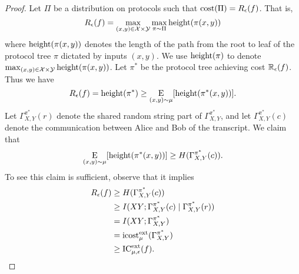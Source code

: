 \begin{proof}

Let $\Pi$ be a distribution on protocols such that $\mathrm{cost}(\Pi) = R_\epsilon(f)$. That is,
$$R_\epsilon(f) = \max_{(x,y) \in \mathcal{X}\times\mathcal{Y}}\max_{\pi \sim \Pi}\operatorname{height}(\pi(x,y))$$ 
where $\operatorname{height}(\pi(x,y))$ denotes the length of the path from the root to leaf of the protocol tree $\pi$ dictated by inputs $(x,y)$. We use $\operatorname{height}(\pi)$ to denote $\max_{(x,y) \in \mathcal{X}\times\mathcal{Y}}\operatorname{height}(\pi(x,y))$. Let $\pi^*$ be the protocol tree achieving cost $\mathbb{R}_\epsilon(f)$. Thus we have
$$R_\epsilon(f) = \operatorname{height}(\pi^*) \geq \operatorname*{\mathrm{E}}_{(x,y) \sim \mu} [\operatorname{height}(\pi^*(x,y))].$$
Let $\Gamma^{\pi^*}_{X,Y}(r)$ denote the shared random string part of $\Gamma^{\pi^*}_{X,Y}$, and let $\Gamma^{\pi^*}_{X,Y}(c)$ denote the communication between Alice and Bob of the transcript. We claim that
$$\operatorname*{\mathrm{E}}_{(x,y) \sim \mu} [\operatorname{height}(\pi^*(x,y))] \geq H(\Gamma^{\pi^*}_{X,Y}(c)).$$
To see this claim is sufficient, observe that it implies 
\begin{align*}
R_\epsilon(f) &\geq H(\Gamma^{\pi^*}_{X,Y}(c)) \\
&\geq I(XY; \Gamma^{\pi^*}_{X,Y}(c) \mid \Gamma^{\pi^*}_{X,Y}(r)) \\
&= I(XY ;\Gamma^{\pi^*}_{X,Y}) \\
&= \mathrm{icost}^{\mathrm{ext}}_\mu(\Gamma^{\pi^*}_{X,Y})\\
&\geq \mathrm{IC}^{\mathrm{ext}}_{\mu,\epsilon}(f).
\end{align*}


\end{proof}
